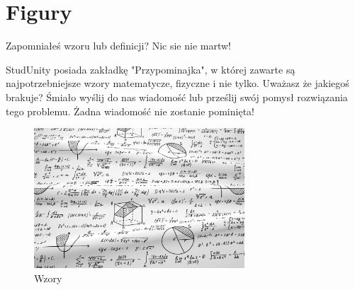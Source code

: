\section{Figury}

\noindent Zapomniałeś wzoru lub definicji? Nic sie nie martw! 

\maketitle StudUnity posiada zakładkę "Przypominajka", w której zawarte są najpotrzebniejsze wzory matematycze, fizyczne i nie tylko. Uważasz że jakiegoś brakuje? Śmiało wyślij do nas wiadomość lub prześlij swój pomysł rozwiązania tego problemu. Żadna wiadomość nie zostanie pominięta!


\begin{figure}[htbp]
    \centering
    \includegraphics[width=0.7\textwidth]{pictures/wzory.jpg}
    \caption{Wzory}
    \label{fig:Wzory}
\end{figure}
